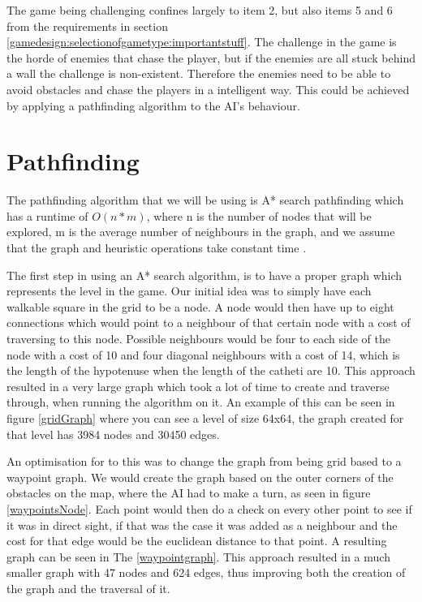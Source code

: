 The game being challenging confines largely to item 2, but also items 5 and 6 from the requirements in section \ref{gamedesign:selectionofgametype:importantstuff}.
The challenge in the game is the horde of enemies that chase the player, but if the enemies are all stuck behind a wall the challenge is non-existent.
Therefore the enemies need to be able to avoid obstacles and chase the players in a intelligent way.
This could be achieved by applying a pathfinding algorithm to the AI's behaviour.

\section{Pathfinding}

The pathfinding algorithm that we will be using is A* search pathfinding which has a runtime of $O(n*m)$, where n is the number of nodes that will be explored, m is the average number of neighbours in the graph, and we assume that the graph and heuristic operations take constant time \cite{AIG:Millington}.

The first step in using an A* search algorithm, is to have a proper graph which represents the level in the game.
Our initial idea was to simply have each walkable square in the grid to be a node.
A node would then have up to eight connections which would point to a neighbour of that certain node with a cost of traversing to this node.
Possible neighbours would be four to each side of the node with a cost of 10 and four diagonal neighbours with a cost of 14, which is the length of the hypotenuse when the length of the catheti are 10.
This approach resulted in a very large graph which took a lot of time to create and traverse through, when running the algorithm on it.
An example of this can be seen in figure \ref{gridGraph} where you can see a level of size 64x64, the graph created for that level has 3984 nodes and 30450 edges.

An optimisation for to this was to change the graph from being grid based to a waypoint graph.
We would create the graph based on the outer corners of the obstacles on the map, where the AI had to make a turn, as seen in figure \ref{waypointsNode}.
Each point would then do a check on every other point to see if it was in direct sight, if that was the case it was added as a neighbour and the cost for that edge would be the euclidean distance to that point.
A resulting graph can be seen in The  \ref{waypointgraph}.
This approach resulted in a much smaller graph with 47 nodes and 624 edges, thus improving both the creation of the graph and the traversal of it.

